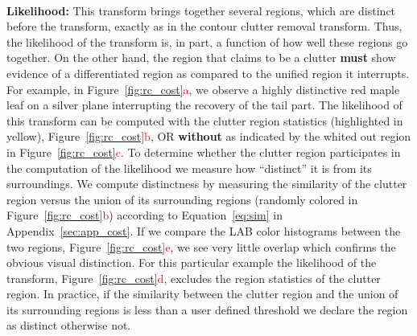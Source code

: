\noindent\\
{\bf Likelihood:} This transform brings together several regions, which are distinct before the transform, exactly as in the contour clutter removal transform. Thus, the likelihood of the transform is, in part, a function of how well these regions go together. On the other hand, the region that claims to be a clutter {\bf must} show evidence of a differentiated region as compared to the unified region it interrupts. For example, in Figure~\ref{fig:rc_cost}\textcolor{red}{a}, we observe a highly distinctive red maple leaf on a silver plane interrupting the recovery of the tail part. The likelihood of this transform can be computed with the clutter region statistics (highlighted in yellow), Figure~\ref{fig:rc_cost}\textcolor{red}{b}, OR {\bf without} as indicated by the whited out region in Figure~\ref{fig:rc_cost}\textcolor{red}{c}. To determine whether the clutter region participates in the computation of the likelihood we measure how ``distinct'' it is from its surroundings. We compute distinctness by measuring the similarity of the clutter region versus the union of its surrounding regions (randomly colored in Figure~\ref{fig:rc_cost}\textcolor{red}{b}) according to Equation~\ref{eq:sim} in Appendix~\ref{sec:app_cost}. If we compare the LAB color histograms between the two regions, Figure~\ref{fig:rc_cost}\textcolor{red}{e}, we see very little overlap which confirms the obvious visual distinction. For this particular example the likelihood of the transform, Figure~\ref{fig:rc_cost}\textcolor{red}{d}, excludes the region statistics of the clutter region. In practice, if the similarity between the clutter region and the union of its surrounding regions is less than a user defined threshold we declare the region as distinct otherwise not. 









